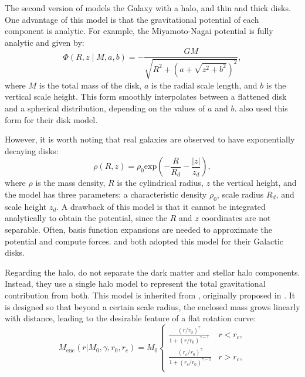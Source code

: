         The second version of \citet{2017A&A...598A..66P} models the Galaxy with a halo, and thin and thick disks. One advantage of this model is that the gravitational potential of each component is analytic. For example, the Miyamoto-Nagai potential \citep{1975PASJ...27..533M} is fully analytic and given by:
        \begin{equation}
            \Phi(R, z \mid M, a, b) = -\frac{G M}{\sqrt{R^2 + \left(a + \sqrt{z^2 + b^2}\right)^2}},
        \end{equation}
        where $M$ is the total mass of the disk, $a$ is the radial scale length, and $b$ is the vertical scale height. This form smoothly interpolates between a flattened disk and a spherical distribution, depending on the values of $a$ and $b$. \citet{2017MNRAS.465...76M} also used this form for their disk model.

        However, it is worth noting that real galaxies are observed to have exponentially decaying disks:
        \begin{equation}
            \rho(R,z) = \rho_0 \mathrm{exp}\left(-\frac{R}{R_d}-\frac{|z|}{z_d}\right),
        \end{equation}
        where $\rho$ is the mass density, $R$ is the cylindrical radius, $z$ the vertical height, and the model has three parameters: a characteristic density $\rho_0$, scale radius $R_d$, and scale height $z_d$. A drawback of this model is that it cannot be integrated analytically to obtain the potential, since the $R$ and $z$ coordinates are not separable. Often, basis function expansions are needed to approximate the potential and compute forces. \citet{2017MNRAS.465...76M} and \citet{2024ApJ...967...89I} both adopted this model for their Galactic disks.

        Regarding the halo, \citet{2017A&A...598A..66P} do not separate the dark matter and stellar halo components. Instead, they use a single halo model to represent the total gravitational contribution from both. This model is inherited from \citet{1991RMxAA..22..255A}, originally proposed in \citet{1986RMxAA..13..137A}. It is designed so that beyond a certain scale radius, the enclosed mass grows linearly with distance, leading to the desirable feature of a flat rotation curve:
        \begin{equation} 
            M_{\mathrm{enc}}(r|M_0,\gamma,r_0,r_c) = M_0
            \begin{cases}
             \frac{\left(r/r_0\right)^\gamma}{1 + \left(r/r_0\right)^{\gamma - 1}} & r<r_c,\\
             \frac{\left(r_c/r_0\right)^\gamma}{1 + \left(r_c/r_0\right)^{\gamma - 1}} & r> r_c,\\
            \end{cases} 
            \label{eq:martos_enclosed_mass}
        \end{equation}

